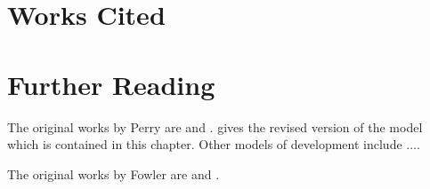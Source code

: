 \section{Works Cited}


\section{Further Reading}


The original works by Perry are \cite{Per:70} and \cite{Per:81}. \cite{Per:81} gives the revised version of the model which is contained in this chapter. Other models of development include $\ldots$.

The original works by Fowler are \cite{Fow:84} and \cite{Fow:95}.


